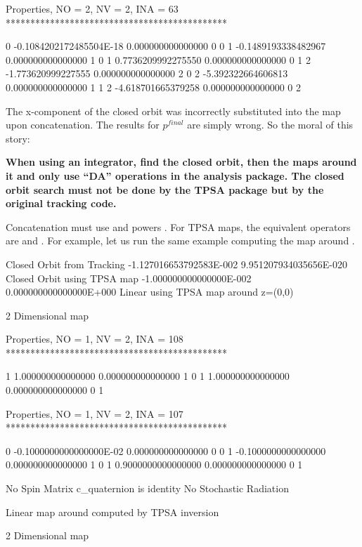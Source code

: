 \documentclass[english,12pt,article]{article} %
\begin{document}
{{{\begin{example2}
 Properties, NO =    2, NV =    2, INA =   63
 *********************************************

   0 -0.1084202172485504E-18   0.000000000000000       0  0
   1 -0.1489193338482967       0.000000000000000       1  0
   1  0.7736209992275550       0.000000000000000       0  1
   2  -1.773620999227555       0.000000000000000       2  0
   2  -5.392322664606813       0.000000000000000       1  1
   2  -4.618701665379258       0.000000000000000       0  2

\end{example2}

The x-component of the closed orbit was incorrectly substituted into the map upon concatenation. The results for $p^{final}$ are simply wrong. So the moral of this story:

{\bf When using an integrator, find the closed orbit, then the maps around it and only use ``DA'' operations in the analysis package. The closed orbit search must not be done by the TPSA package but by the original tracking code.}

 Concatenation must use  \vn{*} and powers \vn{**}. For TPSA maps, the equivalent operators are  and . For example, let us run the same example computing the map around  .

\begin{example2}
  Closed Orbit from Tracking  -1.127016653792583E-002  9.951207934035656E-020
  Closed Orbit using TPSA map -1.000000000000000E-002  0.000000000000000E+000
  Linear using TPSA map around z=(0,0)

           2  Dimensional map

 Properties, NO =    1, NV =    2, INA =  108
 *********************************************

   1   1.000000000000000       0.000000000000000       1  0
   1   1.000000000000000       0.000000000000000       0  1


 Properties, NO =    1, NV =    2, INA =  107
 *********************************************

   0 -0.1000000000000000E-02   0.000000000000000       0  0
   1 -0.1000000000000000       0.000000000000000       1  0
   1  0.9000000000000000       0.000000000000000       0  1

  No Spin Matrix
  c_quaternion is identity
 No Stochastic Radiation
 
  Linear map around computed by TPSA inversion

           2  Dimensional map


\end{example2}}}}
\end{document}
